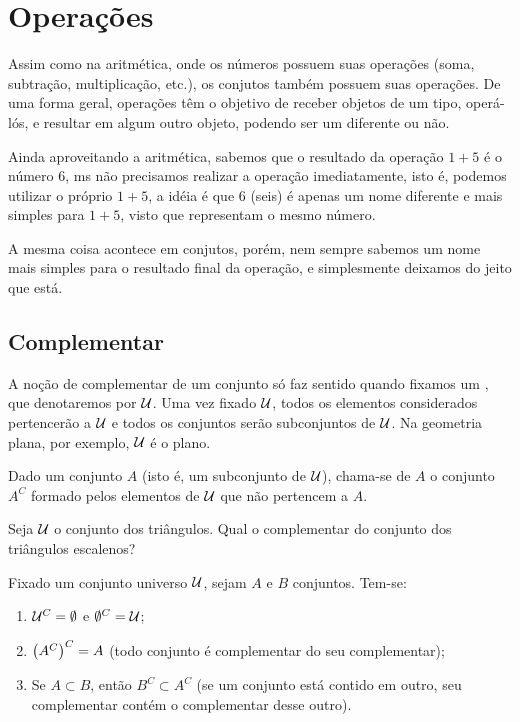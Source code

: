 \section{Operações}
Assim como na aritmética, onde os números possuem suas operações (soma, subtração,  multiplicação, etc.), os conjutos também possuem suas operações.
De uma forma geral, operações têm o objetivo de receber objetos de um tipo, operá-lós, e resultar em algum outro objeto, podendo ser um diferente ou não.

Ainda aproveitando a aritmética, sabemos que o resultado da operação $1 + 5$ é o número $6$, ms não precisamos realizar a operação imediatamente, isto é, podemos utilizar o próprio $1 + 5$, a idéia é que $6$ (seis) é apenas um nome diferente e mais simples para $1 + 5$, visto que representam o mesmo número.

A mesma coisa acontece em conjutos, porém, nem sempre sabemos um nome mais simples para o resultado final da operação, e simplesmente deixamos do jeito que está.

\subsection{Complementar}
A noção de complementar de um conjunto só faz sentido quando fixamos um , que denotaremos por $\mathcal{U}$. Uma vez fixado $\mathcal{U}$, todos os elementos considerados pertencerão a $\mathcal{U}$ e todos os conjuntos serão subconjuntos de $\mathcal{U}$. Na geometria plana, por exemplo, $\mathcal{U}$ é o plano.

\begin{definition}
Dado um conjunto $A$ (isto é, um subconjunto de $\mathcal{U}$), chama-se  de $A$ o conjunto $A^C$ formado pelos elementos de $\mathcal{U}$ que não pertencem a $A$.
\end{definition}

\begin{example}
Seja $\mathcal{U}$ o conjunto dos triângulos. Qual o complementar do conjunto dos triângulos escalenos?
\end{example}

\begin{proposition}
\label{prop-complementar}
Fixado um conjunto universo $\mathcal{U}$, sejam $A$ e $B$ conjuntos. Tem-se:
%
\begin{enumerate}
	\item $\mathcal{U}^C=\emptyset$ e $\emptyset^C = \mathcal{U}$;
	\item $\left(A^C\right)^C=A$ (todo conjunto é complementar do seu complementar);
	\item Se $A \subset B$, então $B^C \subset A^C$ (se um conjunto está contido em outro, seu complementar contém o complementar desse outro). 
\end{enumerate}
\end{proposition}

